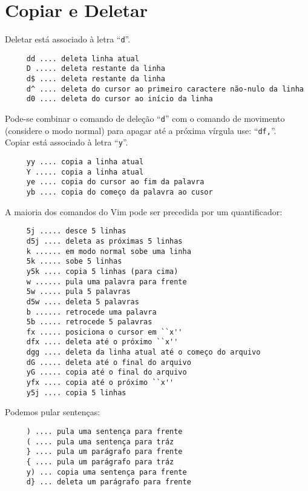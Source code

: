 \section{Copiar e Deletar}\label{sec:Copiar e Deletar}

Deletar está associado à letra ``\verb|d|''.

\begin{verbatim}
     dd .... deleta linha atual
     D ..... deleta restante da linha
     d$ .... deleta restante da linha
     d^ .... deleta do cursor ao primeiro caractere não-nulo da linha
     d0 .... deleta do cursor ao início da linha
\end{verbatim}


{\Large {}} Pode-se combinar o comando de deleção ``\verb+d+'' com o
comando de movimento (considere o modo normal) para apagar até a
próxima vírgula use: ``\verb+df,+''. \\


Copiar está associado à letra ``\verb|y|''.

\begin{verbatim}
     yy .... copia a linha atual
     Y ..... copia a linha atual
     ye .... copia do cursor ao fim da palavra
     yb .... copia do começo da palavra ao cusor
\end{verbatim}

A maioria dos comandos do Vim pode ser precedida por um quantificador:

\begin{verbatim}
     5j ..... desce 5 linhas
     d5j .... deleta as próximas 5 linhas
     k ...... em modo normal sobe uma linha
     5k ..... sobe 5 linhas
     y5k .... copia 5 linhas (para cima)
     w ...... pula uma palavra para frente
     5w ..... pula 5 palavras
     d5w .... deleta 5 palavras
     b ...... retrocede uma palavra
     5b ..... retrocede 5 palavras
     fx ..... posiciona o cursor em ``x''
     dfx .... deleta até o próximo ``x''
     dgg .... deleta da linha atual até o começo do arquivo
     dG ..... deleta até o final do arquivo
     yG ..... copia até o final do arquivo
     yfx .... copia até o próximo ``x''
     y5j .... copia 5 linhas
\end{verbatim}

Podemos pular sentenças:

\begin{verbatim}
     ) .... pula uma sentença para frente
     ( .... pula uma sentença para tráz
     } .... pula um parágrafo para frente
     { .... pula um parágrafo para tráz
     y) ... copia uma sentença para frente
     d} ... deleta um parágrafo para frente
\end{verbatim}


